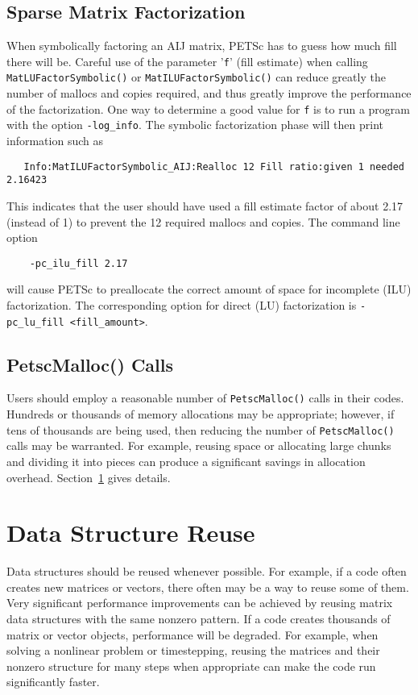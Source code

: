 \subsection{Sparse Matrix Factorization}
\label{sec:symbolfactor}

When symbolically factoring an AIJ matrix, PETSc has to guess
how much fill there will be.  Careful use of the parameter '{\tt f}' (fill
estimate) when calling {\tt MatLUFactorSymbolic()} or {\tt MatILUFactorSymbolic()}
can reduce greatly the number of mallocs and copies required, and thus
greatly improve the performance of the factorization.  One way to
determine a good value for {\tt f} is to run a program with the option {\tt -log\_info}.
The symbolic factorization phase will then print information such as
\begin{verbatim}
   Info:MatILUFactorSymbolic_AIJ:Realloc 12 Fill ratio:given 1 needed 2.16423
\end{verbatim}
This indicates that the user should have used a fill estimate factor of
about 2.17 (instead of 1) to prevent the 12 required mallocs and copies.
The command line option   
\begin{verbatim}
    -pc_ilu_fill 2.17
\end{verbatim}
will cause PETSc to preallocate the correct amount of space for incomplete
(ILU) factorization.  The corresponding option for direct (LU) factorization
is {\tt -pc\_lu\_fill <fill\_amount>}.

\subsection{PetscMalloc() Calls}
Users should employ a reasonable number of {\tt PetscMalloc()} calls in their codes.
Hundreds or thousands of memory allocations may be appropriate; however, if tens of 
thousands are being used, then reducing the number of {\tt PetscMalloc()} calls
may be warranted.  For example, reusing space or allocating large chunks 
and dividing it into pieces can produce a significant savings in 
allocation overhead.  Section~\ref{sec:dsreuse} gives details.

\section{Data Structure Reuse}
\label{sec:dsreuse}

Data structures should be reused whenever possible.  For example, if a code often
creates new matrices or vectors, there often may be a way to reuse some
of them.  Very significant performance improvements can be achieved by
reusing matrix data structures with the same nonzero pattern.  If a code
creates thousands of matrix or vector objects, performance will be
degraded.  For example, when solving a nonlinear problem or timestepping,
reusing the matrices and their nonzero structure for many steps when
 appropriate can make the code run significantly faster.  

